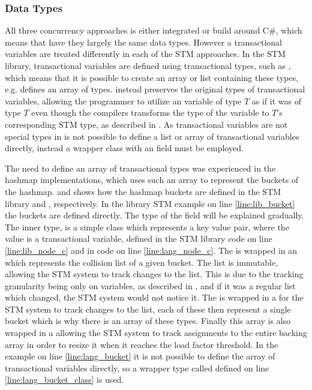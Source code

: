 \subsubsection{Data Types}\label{subsec:datatypes}
All three concurrency approaches is either integrated or build around C\#, which means that have they largely the same data types. However a transactional variables are treated differently in each of the \ac{STM} approaches. In the \ac{STM} library, transactional variables are defined using transactional types, such as , which means that it is possible to create an array or list containing these types, e.g.  defines an array of  types. \stmname instead  preserves the original types of transactional variables, allowing the programmer to utilize an  variable of type $T$ as if it was of type $T$ even though the compilers transforms the type of the variable to $T$'s corresponding \ac{STM} type, as described in . As transactional variables are not special types in \stmname is not possible to define a list or array of transactional variables directly, instead a wrapper class with an  field must be employed.

The need to define an array of transactional types was experienced in the hashmap implementations, which uses such an array to represent the buckets of the hashmap.  and  shows how the hashmap buckets are defined in the \ac{STM} library and \stmname, respectively. In the library \ac{STM} example on line \ref{line:lib_bucket} the buckets are defined directly. The type of the  field will be explained gradually. The inner  type, is a simple class which represents a key value pair, where the value is a transactional variable, defined in the \ac{STM} library code on line \ref{line:lib_node_c} and in \stmname code on line \ref{line:lang_node_c}. The  is wrapped in an  which represents the collision list of a given bucket. The list is immutable, allowing the \ac{STM} system to track changes to the list. This is due to the tracking granularity being only on variables, as described in , and if it was a regular list which changed, the \ac{STM} system would not notice it. The  is wrapped in a  for the \ac{STM} system to track changes to the list, each of these then represent a single bucket which is why there is an array of these types. Finally this array is also wrapped in a  allowing the \ac{STM} system to track assignments to the entire backing array in order to resize it when it reaches the load factor threshold. In the \stmname example on line \ref{line:lang_bucket} it is not possible to define the array of transactional variables directly, so a wrapper type called  defined on line \ref{line:lang_bucket_class} is used.

